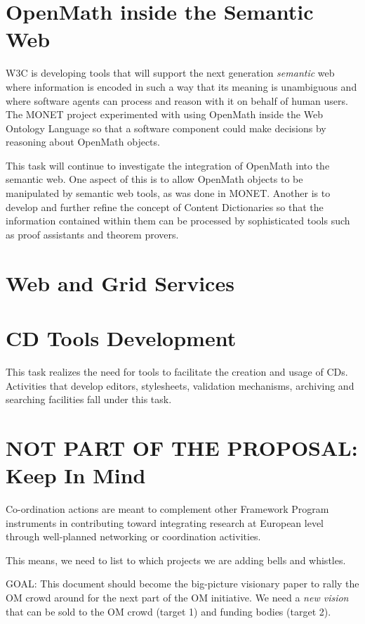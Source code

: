\documentclass[draft]{artikel3}
\begin{document}
\section{OpenMath inside the Semantic Web}

W3C is developing tools that will support the next generation
\emph{semantic} web where information is encoded in such a way that
its meaning is unambiguous and where software agents can process and
reason with it on behalf of human users.  The MONET project
experimented with using OpenMath inside the Web Ontology Language so
that a software component could make decisions by reasoning about
OpenMath objects.

This task will continue to investigate the integration of OpenMath
into the semantic web.  One aspect of this is to allow OpenMath
objects to be manipulated by semantic web tools, as was done in MONET.
Another is to develop and further refine the concept of Content
Dictionaries so that the information contained within them can be
processed by sophisticated tools such as proof assistants and theorem
provers.

\section{Web and Grid Services}




\section{CD Tools Development} 
\label{tools}

This task realizes the need for tools to facilitate the creation and
usage of CDs. Activities that develop editors, stylesheets, validation
mechanisms, archiving and searching facilities fall under this task.

\newpage
\setcounter{tocdepth}{2}\tableofcontents

\section{NOT PART OF THE PROPOSAL:  Keep In Mind}
Co-ordination actions are meant to complement other Framework
Program instruments in contributing toward integrating research at
European level through well-planned networking or coordination
activities.

This means, we need to list to which projects we are adding bells and
whistles.

GOAL: This document should become the big-picture visionary paper to
rally the OM crowd around for the next part of the OM initiative.  We
need a \emph{new vision} that can be sold to the OM crowd (target 1)
and funding bodies (target 2).
\end{document}
